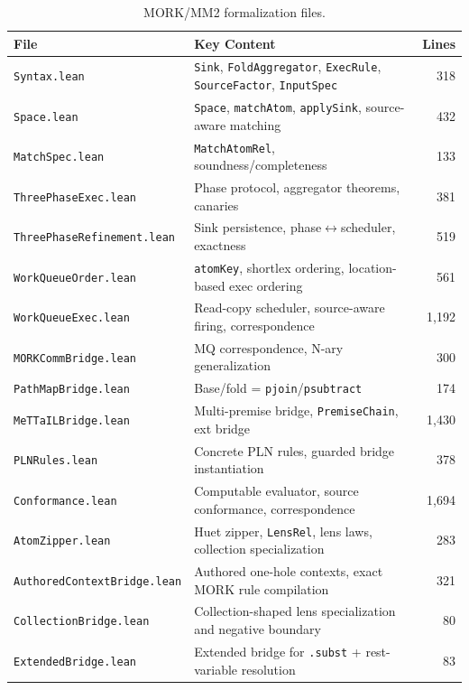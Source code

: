 \documentclass[11pt]{article}
\theoremstyle{definition}
\theoremstyle{remark}
\newcommand{\MORK}{\textup{MORK}}
\begin{document}
\begin{table}[ht]
\centering
\caption{\MORK{}/MM2 formalization files.}
\label{tab:morkfiles}
\begin{tabular}{@{}llr@{}}
\toprule
\textbf{File} & \textbf{Key Content} & \textbf{Lines} \\
\midrule
\texttt{Syntax.lean}              & \texttt{Sink}, \texttt{FoldAggregator}, \texttt{ExecRule}, \texttt{SourceFactor}, \texttt{InputSpec} & 318 \\
\texttt{Space.lean}               & \texttt{Space}, \texttt{matchAtom}, \texttt{applySink}, source-aware matching & 432 \\
\texttt{MatchSpec.lean}           & \texttt{MatchAtomRel}, soundness/completeness & 133 \\
\texttt{ThreePhaseExec.lean}      & Phase protocol, aggregator theorems, canaries & 381 \\
\texttt{ThreePhaseRefinement.lean}& Sink persistence, phase$\leftrightarrow$scheduler, exactness & 519 \\
\texttt{WorkQueueOrder.lean}      & \texttt{atomKey}, shortlex ordering, location-based exec ordering & 561 \\
\texttt{WorkQueueExec.lean}       & Read-copy scheduler, source-aware firing, correspondence & 1{,}192 \\
\texttt{MORKCommBridge.lean}      & MQ correspondence, N-ary generalization & 300 \\
\texttt{PathMapBridge.lean}       & Base/fold = \texttt{pjoin}/\texttt{psubtract} & 174 \\
\texttt{MeTTaILBridge.lean}       & Multi-premise bridge, \texttt{PremiseChain}, ext bridge & 1{,}430 \\
\texttt{PLNRules.lean}            & Concrete PLN rules, guarded bridge instantiation & 378 \\
\texttt{Conformance.lean}         & Computable evaluator, source conformance, correspondence & 1{,}694 \\
\texttt{AtomZipper.lean}          & Huet zipper, \texttt{LensRel}, lens laws, collection specialization & 283 \\
\texttt{AuthoredContextBridge.lean} & Authored one-hole contexts, exact MORK rule compilation & 321 \\
\texttt{CollectionBridge.lean}    & Collection-shaped lens specialization and negative boundary & 80 \\
\texttt{ExtendedBridge.lean}      & Extended bridge for \texttt{.subst} + rest-variable resolution & 83 \\

\end{tabular}
\end{table}
\end{document}
